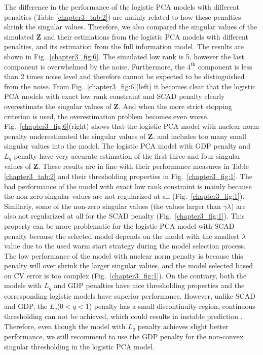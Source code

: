 The difference in the performance of the logistic PCA models with different penalties (Table \ref{chapter3_tab:2}) are mainly related to how these penalties shrink the singular values. Therefore, we also compared the singular values of the simulated $\mathbf{Z}$ and their estimations from the logistic PCA models with different penalties, and its estimation from the full information model. The results are shown in Fig.~\ref{chapter3_fig:6}. The simulated low rank is 5, however the last component is overwhelmed by the noise. Furthermore, the $4^{\text{th}}$ component is less than 2 times noise level and therefore cannot be expected to be distinguished from the noise. From Fig.~\ref{chapter3_fig:6}(left) it becomes clear that the logistic PCA models with exact low rank constraint and SCAD penalty clearly overestimate the singular values of $\mathbf{Z}$. And when the more strict stopping criterion is used, the overestimation problem becomes even worse. Fig.~\ref{chapter3_fig:6}(right) shows that the logistic PCA model with nuclear norm penalty underestimated the singular values of $\mathbf{Z}$, and includes too many small singular values into the model. The logistic PCA model with GDP penalty and $L_{q}$ penalty have very accurate estimation of the first three and four singular values of $\mathbf{Z}$. These results are in line with their performance measures in Table \ref{chapter3_tab:2} and their thresholding properties in Fig.~\ref{chapter3_fig:1}. The bad performance of the model with exact low rank constraint is mainly because the non-zero singular values are not regularized at all (Fig.~\ref{chapter3_fig:1}). Similarly, some of the non-zero singular values (the values larger than $\gamma \lambda$) are also not regularized at all for the SCAD penalty (Fig.~\ref{chapter3_fig:1}). This property can be more problematic for the logistic PCA model with SCAD penalty because the selected model depends on the model with the smallest $\lambda$ value due to the used warm start strategy during the model selection process. The low performance of the model with nuclear norm penalty is because this penalty will over shrink the larger singular values, and the model selected based on CV error is too complex (Fig.~\ref{chapter3_fig:1}). On the contrary, both the models with $L_{q}$ and GDP penalties have nice thresholding properties and the corresponding logistic models have superior performance. However, unlike SCAD and GDP, the $L_{q}$($0<q<1$) penalty has a small discontinuity region, continuous thresholding can not be achieved, which could results in instable prediction \cite{fan2001variable}. Therefore, even though the model with $L_{q}$ penalty achieves slight better performance, we still recommend to use the GDP penalty for the non-convex singular thresholding in the logistic PCA model.
